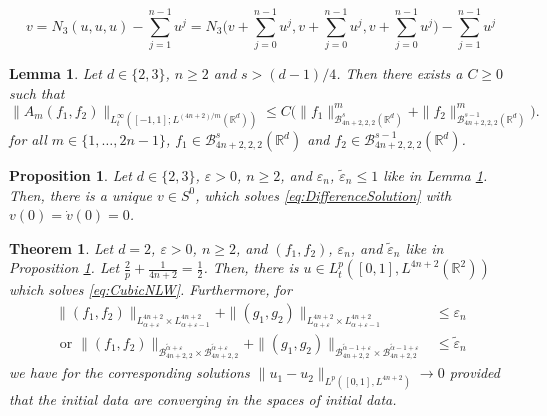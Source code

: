 \documentclass[10pt,a4paper]{amsart}
\newtheorem{lemma}{Lemma}
\newtheorem{proposition}{Proposition}
\newtheorem{theorem}{Theorem}
\newcommand {\Ba}{\mathcal{B}}
\newcommand{\R}{\mathbb{R}}
\begin{document}
\begin{equation}
\label{eq:DifferenceSolution}
v = N_3(u,u,u) - \sum_{j=1}^{n-1} u^j = N_3\Big(v + \sum_{j=0}^{n-1} u^j, v+ \sum_{j=0}^{n-1} u^j, v + \sum_{j=0}^{n-1} u^j\Big)-\sum_{j=1}^{n-1} u^j
\end{equation}

\begin{lemma}
\label{lem:IterationAm}
Let $d \in \{2, 3 \}$, $n \geq 2$ and $s >(d-1)/4$. Then there exists a $C\geq0$ such that
\[
\| A_m(f_{1},f_{2}) \|_{L_t^\infty([-1,1];L^{(4n+2)/m}(\R^d)) } \leq C\big( \| f_{1} \|^m_{\Ba^{s}_{4n+2,2,2}(\R^d)} + \| f_{2} \|^m_{\Ba^{s-1}_{4n+2,2,2}(\R^d)}\big).
\]
for all $m \in \{1,\ldots, 2n-1\}$, $f_{1}\in \Ba^{s}_{4n+2,2,2}(\R^d)$ and $f_{2}\in \Ba^{s-1}_{4n+2,2,2}(\R^d)$.
\end{lemma}

\begin{proposition}
\label{prop:ExistenceDifferenceSolution}
Let $d \in \{2,3\}$, $\varepsilon > 0$, $n \geq 2$, and $\varepsilon_n$, $\tilde{\varepsilon}_n \leq 1$ like in Lemma \ref{lem:IterationAm}. Then, there is a unique $v \in S^0$, which solves \eqref{eq:DifferenceSolution} with $v(0) = \dot{v}(0) = 0$.
\end{proposition}

\begin{theorem}
\label{thm:SlowlyDecayingData}
Let $d=2$, $\varepsilon > 0$, $n \geq 2$, and $(f_1,f_2)$, $\varepsilon_n$, and $\tilde{\varepsilon}_n$ like in Proposition \ref{prop:ExistenceDifferenceSolution}. Let $\frac{2}{p} + \frac{1}{4n+2} = \frac{1}{2}$. Then, there is $u \in L_t^p([0,1],L^{4n+2}(\R^2))$ which solves \eqref{eq:CubicNLW}. Furthermore, for 
\begin{align*}
\| (f_1,f_2) \|_{L^{4n+2}_{\alpha+\varepsilon} \times L^{4n+2}_{\alpha + \varepsilon -1}} + \| (g_1,g_2) \|_{L^{4n+2}_{\alpha+\varepsilon} \times L^{4n+2}_{\alpha + \varepsilon -1}} &\leq \varepsilon_n \\
\text{ or } 
\| (f_1,f_2) \|_{\mathcal{B}^{\tilde{\alpha}+\varepsilon}_{4n+2,2} \times \mathcal{B}^{\tilde{\alpha}+\varepsilon}_{4n+2,2}} + \| (g_1,g_2) \|_{\mathcal{B}^{\tilde{\alpha}-1+\varepsilon}_{4n+2,2} \times \mathcal{B}^{\tilde{\alpha}-1+\varepsilon}_{4n+2,2}} &\leq \tilde{\varepsilon}_n
\end{align*}
we have for the corresponding solutions $\| u_1 - u_2 \|_{L^p([0,1],L^{4n+2})} \to 0$ provided that the initial data are converging in the spaces of initial data.
\end{theorem}
\end{document}
